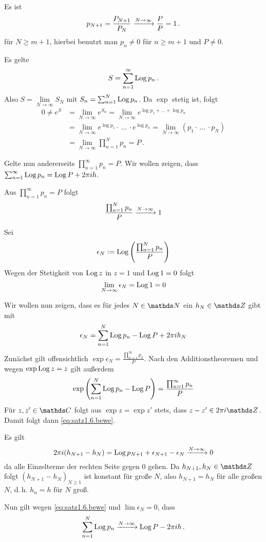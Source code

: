 \begin{bewe-list}
\item Es ist
\[
	p_{N+1}
	= \frac{P_{N+1}}{P_N}
	\xrightarrow{N\to\infty} \frac{P}{P}
	= 1
	\,.
\]
für $N\geq m+1$, hierbei benutzt man $p_n \not= 0$ für $n\geq m+1$ und $P \not= 0$.

\item Es gelte
\[
	S
	= \sum _{n=1}^\infty \operatorname{Log} p_n
	\,.
\]
Also $S = \lim \limits _{N\to\infty} S_N$ mit $S_n = \sum_{n=1}^N \operatorname{Log} p_n$.
Da $\exp$ stetig ist, folgt
\begin{align*}
	0
	\not= e^S
	&= \lim _ {N\to \infty} e^{S_n} = \lim_{N\to\infty} e^{\log p_1 + \ldots + \log p_n} \\
	&= \lim _ {N\to \infty} e^{\log p_1} \cdot\,\ldots\,\cdot e^{\log p_n}
	= \lim _ {N\to \infty} (p_1 \cdot\,\ldots\,\cdot p_N) \\
	&= \lim _ {N\to \infty} \prod _{n=1}^N p_n
	= P
	\,.
\end{align*}

Gelte nun andererseits $\prod_{n=1}^\infty p_n = P$.
Wir wollen zeigen, dass $\sum _{n=1}^\infty \operatorname{Log} p_n = \operatorname{Log} P + 2\pi ih$.

Aus $\prod_{n=1}^\infty p_n = P$ folgt
\[
	\frac{\prod_{n=1}^N p_n}{P} \xrightarrow{N\to\infty} 1
\]

Sei
\[
	\epsilon_N := \operatorname{Log} \left(\frac{\prod_{n=1}^N p_n}{P}\right)
\]
Wegen der Stetigkeit von $\operatorname{Log} z$ in $z=1$ und $\operatorname{Log} 1 = 0$ folgt
\[
	\lim_{N\to\infty}\epsilon_N = \operatorname{Log} 1 = 0
\]

Wir wollen nun zeigen, dass es für jedes $N\in\NN$ ein $h_N\in\ZZ$ gibt mit
\begin{equation}\label{eq:satz1.6.bewe}
	\epsilon_N = \sum_{n=1}^N \operatorname{Log} p_n - \operatorname{Log} P + 2\pi i h_N
\end{equation}
Zunächst gilt  offensichtlich $\exp \epsilon_N = \frac{\prod_{n=1}^\infty p_n}{P}$.
Nach den Additionstheoremen und wegen $\exp\operatorname{Log} z = z$ gilt außerdem
\[
	\exp \left(\sum_{n=1}^N \operatorname{Log} p_n - \operatorname{Log} P\right)
	= \frac{\prod_{n=1}^\infty p_n}{P}
\]
Für $z, z' \in \CC$ folgt aus $\exp z = \exp z'$ stets, dass $z-z'\in 2\pi i\ZZ$. Damit folgt dann \eqref{eq:satz1.6.bewe}.

Es gilt
\[
	2\pi i(h_{N+1}-h_N) = \operatorname{Log} p_{N+1} + \epsilon_{N+1}-\epsilon_N \xrightarrow{N\to\infty} 0
\]
da alle Einzelterme der rechten Seite gegen 0 gehen.
Da $h_{N+1}, h_N\in\ZZ$ folgt $(h_{N+1} - h_N)_{N\geq 1}$ ist konstant für große $N$, also $h_{N+1} = h_N$ für alle großen $N$, d.\,h. $h_n = h$ für $N$ groß.

Nun gilt wegen \eqref{eq:satz1.6.bewe} und $\lim \epsilon_N = 0$, dass
\[
	\sum_{n=1}^N \operatorname{Log} p_n
	\xrightarrow{N\to\infty}
	\operatorname{Log} P - 2\pi i h
	\,.
\]
\end{bewe-list}

